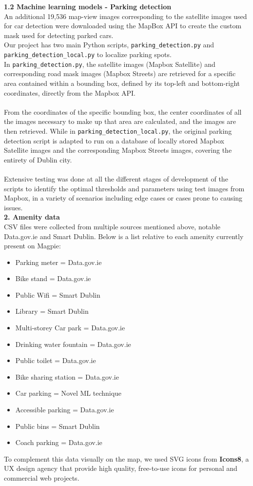 \textbf{1.2 Machine learning models - Parking detection}\\
An additional 19,536 map-view images corresponding to the satellite images used for car detection were downloaded using the MapBox API to create the custom mask used for detecting parked cars.\\
Our project has two main Python scripts, \texttt{parking\_detection.py} and\\ \texttt{parking\_detection\_local.py} to localize parking spots.\\
In \texttt{parking\_detection.py}, the satellite images (Mapbox Satellite) and corresponding road mask images (Mapbox Streets) are retrieved for a specific area contained within a bounding box, defined by its top-left and bottom-right coordinates, directly from the Mapbox API.\\ \\
From the coordinates of the specific bounding box, the center coordinates of all the images necessary to make up that area are calculated, and the images are then retrieved.
While in \texttt{parking\_detection\_local.py}, the original parking detection script is adapted to run on a database of locally stored Mapbox Satellite images and the corresponding Mapbox Streets images, covering the entirety of Dublin city.\\ \\

Extensive testing was done at all the different stages of development of the scripts to identify the optimal thresholds and parameters using test images from Mapbox, in a variety of scenarios including edge cases or cases prone to causing issues.\\

\textbf{2. Amenity data}\\
CSV files were collected from multiple sources mentioned above, notable Data.gov.ie and Smart Dublin. Below is a list relative to each amenity currently present on Magpie:
\begin{itemize}
    \item Parking meter = Data.gov.ie
    \item Bike stand = Data.gov.ie
    \item Public Wifi = Smart Dublin
    \item Library = Smart Dublin
    \item Multi-storey Car park = Data.gov.ie
    \item Drinking water fountain = Data.gov.ie
    \item Public toilet = Data.gov.ie
    \item Bike sharing station = Data.gov.ie
    \item Car parking = Novel ML technique
    \item Accessible parking = Data.gov.ie
    \item Public bins = Smart Dublin
    \item Coach parking = Data.gov.ie
\end{itemize}
To complement this data visually on the map, we used SVG icons from \textbf{Icons8}, a UX design agency that provide high quality, free-to-use icons for personal and commercial web projects.\\

